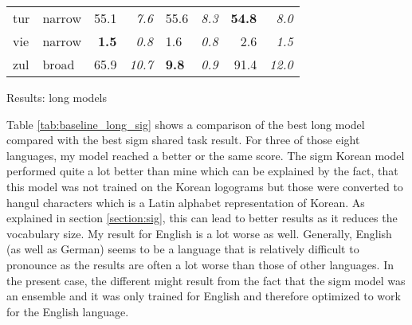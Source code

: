 {\begin{tabularx}{\textwidth}{|l|X||r|r||X|X||r|r|}
tur       & narrow        & 55.1         & \textit{7.6}    & 55.6         & \textit{8.3}          & \textbf{54.8}   & \textit{8.0}    \\
vie       & narrow        & \textbf{1.5} & \textit{0.8}    & 1.6          & \textit{0.8}          & 2.6    & \textit{1.5}    \\
zul       & broad         & 65.9         & \textit{10.7}   & \textbf{9.8}          & \textit{0.9}          & 91.4   & \textit{12.0}   \\ \hline
\end{tabularx}
}{Results: long models}

Table \ref{tab:baseline_long_sig} shows a comparison of the best long model compared with the best \ac{sigm} shared task result. For three of those eight languages, my model reached a better or the same score. The \ac{sigm} Korean model performed quite a lot better than mine which can be explained by the fact, that this model was not trained on the Korean logograms but those were converted to hangul characters which is a Latin alphabet representation of Korean. As explained in section \ref{section:sig}, this can lead to better results as it reduces the vocabulary size. My result for English is a lot worse as well. Generally, English (as well as German) seems to be a language that is relatively difficult to pronounce as the results are often a lot worse than those of other languages. In the present case, the different might result from the fact that the \ac{sigm} model was an ensemble and it was only trained for English and therefore optimized to work for the English language. 





